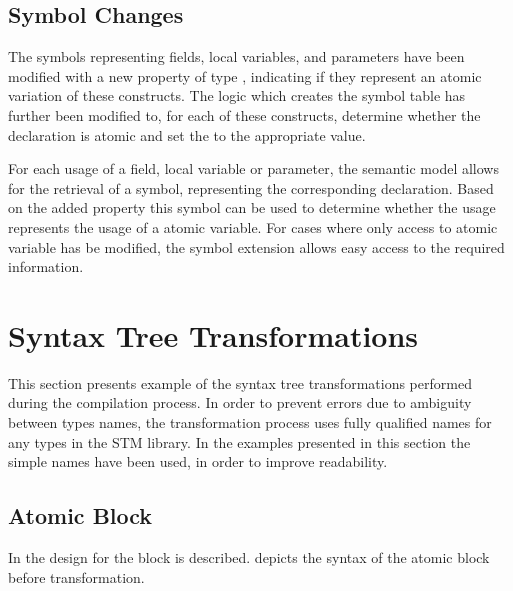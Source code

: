 \subsection{Symbol Changes}
The symbols representing fields, local variables, and parameters have been modified with a new  property of type , indicating if they represent an atomic variation of these constructs. The logic which creates the symbol table has further been modified to, for each of these constructs, determine whether the declaration is atomic and set the  to the appropriate value.

For each usage of a field, local variable or parameter, the semantic model allows for the retrieval of a symbol, representing the corresponding declaration. Based on the added  property this symbol can be used to determine whether the usage represents the usage of a atomic variable. For cases where only access to atomic variable has be modified, the symbol extension allows easy access to the required information.

\section{Syntax Tree Transformations}
\label{sec:syntax_tree_transformations}
This section presents example of the syntax tree transformations performed during the compilation process. In order to prevent errors due to ambiguity between types names, the transformation process uses fully qualified names\cite[p. 73]{csharp2013specificaiton}  for any types in the \ac{STM} library. In the examples presented in this section the simple names have been used, in order to improve readability. 

\subsection{Atomic Block}
In  the design for the  block is described.  depicts the syntax of the atomic block before transformation. 

